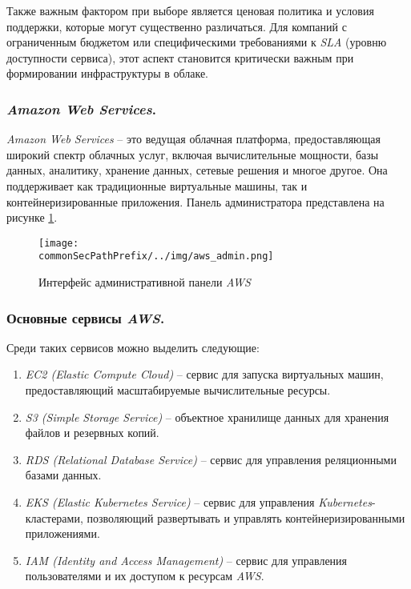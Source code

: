 Также важным фактором при выборе является ценовая политика и условия поддержки, которые могут существенно различаться. Для компаний с ограниченным бюджетом или специфическими требованиями к \textit{SLA} (уровню доступности сервиса), этот аспект становится критически важным при формировании инфраструктуры в облаке.

\subsubsection{\textit{Amazon Web Services}.}
\label{sec:aws}
\textit{Amazon Web Services} -- это ведущая облачная платформа, предоставляющая широкий спектр облачных услуг, включая вычислительные мощности, базы данных, аналитику, хранение данных, сетевые решения и многое другое. Она поддерживает как традиционные виртуальные машины, так и контейнеризированные приложения. Панель администратора представлена на рисунке \ref{fig:user_guide:aws_admin}.

\begin{figure}[ht]
    \centering
    \texttt{[image: \\commonSecPathPrefix/../img/aws\_admin.png]}
    \caption{Интерфейс административной панели \textit{AWS}}
    \label{fig:user_guide:aws_admin}
\end{figure}

\subsubsection{Основные сервисы \textit{AWS}.} Среди таких сервисов можно выделить следующие:
\begin{enumerate}
    \item \textit{EC2 (Elastic Compute Cloud)} -- сервис для запуска виртуальных машин, предоставляющий масштабируемые вычислительные ресурсы.
    \item \textit{S3 (Simple Storage Service)} -- объектное хранилище данных для хранения файлов и резервных копий.
    \item \textit{RDS (Relational Database Service)} -- сервис для управления реляционными базами данных.
    \item \textit{EKS (Elastic Kubernetes Service)} -- сервис для управления \textit{Kubernetes}-кластерами, позволяющий развертывать и управлять контейнеризированными приложениями.
    \item \textit{IAM (Identity and Access Management)} -- сервис для управления пользователями и их доступом к ресурсам \textit{AWS}.
\end{enumerate}

